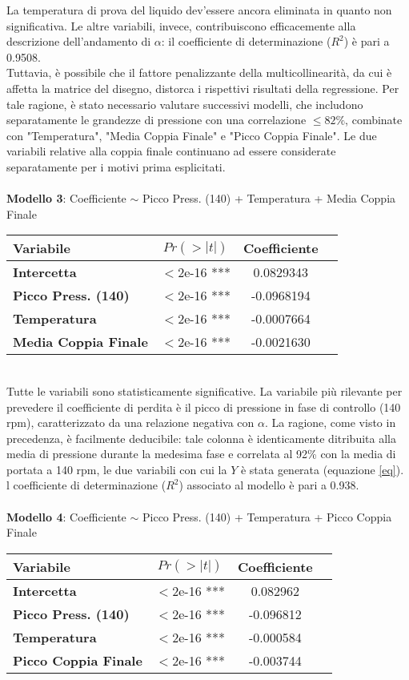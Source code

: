 \documentclass[fleqn,10pt]{SelfArx} %
\begin{document}
La temperatura di prova del liquido dev'essere ancora eliminata in quanto non significativa. Le altre variabili, invece, contribuiscono efficacemente alla descrizione dell'andamento di $\alpha$: il coefficiente di determinazione ($R^2$) è pari a 0.9508.\\
Tuttavia, è possibile che il fattore penalizzante della multicollinearità, da cui è affetta la matrice del disegno, distorca i rispettivi risultati della regressione. Per tale ragione, è stato necessario valutare successivi modelli, che includono separatamente le grandezze di pressione con una correlazione $\leq 82\%$, combinate con "Temperatura", "Media Coppia Finale" e "Picco Coppia Finale". Le due variabili relative alla coppia finale continuano ad essere considerate separatamente per i motivi prima esplicitati.\\
\\
\textbf{Modello 3}:  Coefficiente $\sim$  Picco Press. (140) + Temperatura + Media Coppia Finale
{\begin{table}[H] 
\centering
\begin{tabular}[t]{lccc}
\toprule 
Variabile&$Pr(> |t|)$&Coefficiente\\
\midrule 
\textbf{Intercetta}&$<$2e-16 ***&0.0829343\\ 
\textbf{Picco Press. (140)}&$<$2e-16 ***&-0.0968194\\
\textbf{Temperatura}&$<$2e-16 ***&-0.0007664\\
\textbf{Media Coppia Finale}&$<$2e-16 ***&-0.0021630\\
\bottomrule 
\end{tabular}
\end{table}}\\
Tutte le variabili sono statisticamente significative. La variabile più rilevante per prevedere il coefficiente di perdita è il picco di pressione in fase di controllo (140 rpm), caratterizzato da una relazione negativa con $\alpha$. La ragione, come visto in precedenza, è facilmente deducibile: tale colonna è identicamente ditribuita alla media di pressione durante la medesima fase e correlata al 92\% con la media di portata a 140 rpm, le due variabili con cui la $Y$ è stata generata (equazione \ref{eq}). l coefficiente di determinazione ($R^2$) associato al modello è pari a 0.938.\\
\\
\textbf{Modello 4}: Coefficiente $\sim$  Picco Press. (140) + Temperatura + Picco Coppia Finale
{\begin{table}[h] 
\centering
\begin{tabular}[t]{lccc}
\toprule 
Variabile&$Pr(> |t|)$&Coefficiente\\
\midrule 
\textbf{Intercetta}&$<$2e-16 ***&0.082962\\ 
\textbf{Picco Press. (140)}&$<$2e-16 ***&-0.096812\\
\textbf{Temperatura}&$<$2e-16 ***&-0.000584\\
\textbf{Picco Coppia Finale}&$<$2e-16 ***&-0.003744\\
\bottomrule 
\end{tabular}
\end{table}}\\
\end{document}
